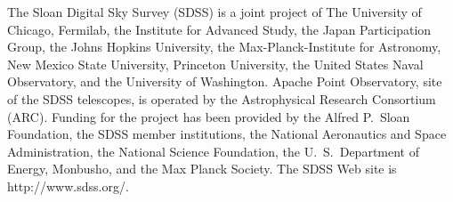 \documentclass[10pt,preprint]{aastex}
\begin{document}
The Sloan Digital Sky Survey (SDSS) is a joint project of The
University of Chicago, Fermilab, the Institute for Advanced Study, the
Japan Participation Group, the Johns Hopkins University, the
Max-Planck-Institute for Astronomy, New Mexico State University,
Princeton University, the United States Naval Observatory, and the
University of Washington. Apache Point Observatory, site of the SDSS
telescopes, is operated by the Astrophysical Research Consortium
(ARC).  Funding for the project has been provided by the Alfred
P.~Sloan Foundation, the SDSS member institutions, the National
Aeronautics and Space Administration, the National Science Foundation,
the U.~S.~Department of Energy, Monbusho, and the Max Planck
Society. The SDSS Web site is http://www.sdss.org/.
 
\begin{thebibliography}{DUM}

\end{thebibliography}

\newpage

%


\end{document}
